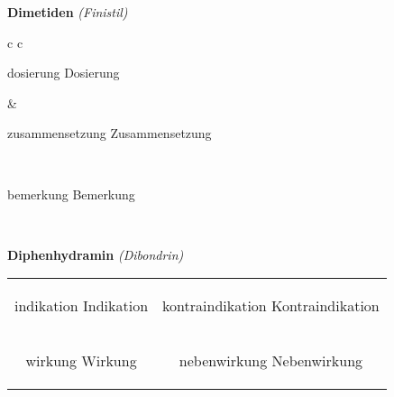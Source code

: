 \documentclass[12pt]{beamer}
\begin{document}
\begin{frame}{
    \textbf{Dimetiden}
    \textit{(Finistil)}
}
    \begin{tabular}{c c}
        \begin{beamercolorbox}[wd=\boxwidth\textwidth,ht=\boxheight\textheight,sep=1em]{dosierung}
        Dosierung
        \end{beamercolorbox} & 
        \begin{beamercolorbox}[wd=\boxwidth\textwidth,ht=\boxheight\textheight,sep=1em]{zusammensetzung}
        Zusammensetzung
        \end{beamercolorbox} \\
        \begin{beamercolorbox}[wd=\textwidth,ht=\boxheight\textheight,sep=1em]{bemerkung}
        Bemerkung
        \end{beamercolorbox} \\
    \end{tabular}
\end{frame}

\begin{frame}{
    \textbf{Diphenhydramin}
    \textit{(Dibondrin)}
}
    \begin{tabular}{c c}
        \begin{beamercolorbox}[wd=\boxwidth\textwidth,ht=\boxheight\textheight,sep=1em]{indikation}
        Indikation
        \end{beamercolorbox} & 
        \begin{beamercolorbox}[wd=\boxwidth\textwidth,ht=\boxheight\textheight,sep=1em]{kontraindikation}
        Kontraindikation 
        \end{beamercolorbox} \\
        \begin{beamercolorbox}[wd=\boxwidth\textwidth,ht=\boxheight\textheight,sep=1em]{wirkung}
        Wirkung
        \end{beamercolorbox} & 
        \begin{beamercolorbox}[wd=\boxwidth\textwidth,ht=\boxheight\textheight,sep=1em]{nebenwirkung}
        Nebenwirkung
        \end{beamercolorbox} \\
    \end{tabular}
\end{frame}
\end{document}
